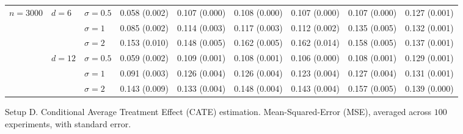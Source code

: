 \documentclass[11pt]{article} %
\theoremstyle{theorem}  %
\theoremstyle{plain}
\begin{document}
\begin{figure}[H]
\begin{tabular}{lllllllll}
\cline{1-9}
\cline{2-9}
\multirow{6}{*}{$n=3000$} & \multirow{3}{*}{$d=6$} & $\sigma=0.5$ &  0.058 (0.002) &  0.107 (0.000) &  0.108 (0.000) &  0.107 (0.000) &  0.107 (0.000) &  0.127 (0.001) \\
         &        & $\sigma=1$ &  0.085 (0.002) &  0.114 (0.003) &  0.117 (0.003) &  0.112 (0.002) &  0.135 (0.005) &  0.132 (0.001) \\
         &        & $\sigma=2$ &  0.153 (0.010) &  0.148 (0.005) &  0.162 (0.005) &  0.162 (0.014) &  0.158 (0.005) &  0.137 (0.001) \\
\cline{2-9}
         & \multirow{3}{*}{$d=12$} & $\sigma=0.5$ &  0.059 (0.002) &  0.109 (0.001) &  0.108 (0.001) &  0.106 (0.000) &  0.108 (0.001) &  0.129 (0.001) \\
         &        & $\sigma=1$ &  0.091 (0.003) &  0.126 (0.004) &  0.126 (0.004) &  0.123 (0.004) &  0.127 (0.004) &  0.131 (0.001) \\
         &        & $\sigma=2$ &  0.143 (0.009) &  0.133 (0.004) &  0.148 (0.004) &  0.143 (0.004) &  0.157 (0.005) &  0.139 (0.000) \\
\bottomrule
\end{tabular}

\caption{Setup D. Conditional Average Treatment Effect (CATE) estimation. Mean-Squared-Error (MSE), averaged across $100$ experiments, with standard error.}
\label{fig:setupD-cate}
\end{figure}
 
\end{document}
